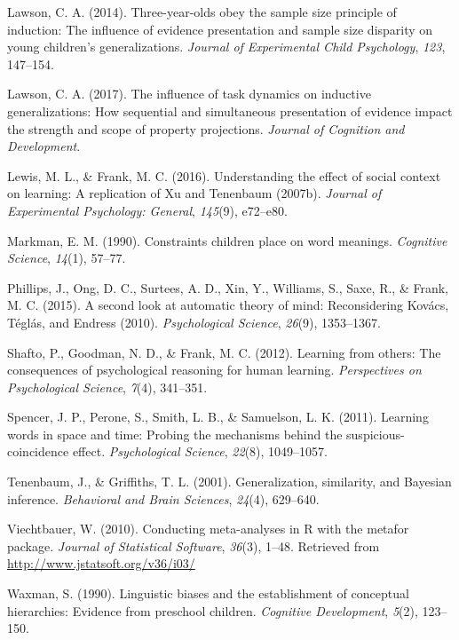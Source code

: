 \documentclass[english,floatsintext,man]{apa6}
\theoremstyle{definition}
\theoremstyle{definition}
\theoremstyle{definition}
\theoremstyle{remark}
\begin{document}
\hypertarget{ref-lawson2014three}{}
Lawson, C. A. (2014). Three-year-olds obey the sample size principle of
induction: The influence of evidence presentation and sample size
disparity on young children's generalizations. \emph{Journal of
Experimental Child Psychology}, \emph{123}, 147--154.

\hypertarget{ref-lawson2017influence}{}
Lawson, C. A. (2017). The influence of task dynamics on inductive
generalizations: How sequential and simultaneous presentation of
evidence impact the strength and scope of property projections.
\emph{Journal of Cognition and Development}.

\hypertarget{ref-lewis2016understanding}{}
Lewis, M. L., \& Frank, M. C. (2016). Understanding the effect of social
context on learning: A replication of Xu and Tenenbaum (2007b).
\emph{Journal of Experimental Psychology: General}, \emph{145}(9),
e72--e80.

\hypertarget{ref-markman1990constraints}{}
Markman, E. M. (1990). Constraints children place on word meanings.
\emph{Cognitive Science}, \emph{14}(1), 57--77.

\hypertarget{ref-phillips2015second}{}
Phillips, J., Ong, D. C., Surtees, A. D., Xin, Y., Williams, S., Saxe,
R., \& Frank, M. C. (2015). A second look at automatic theory of mind:
Reconsidering Kovács, Téglás, and Endress (2010). \emph{Psychological
Science}, \emph{26}(9), 1353--1367.

\hypertarget{ref-shafto2012}{}
Shafto, P., Goodman, N. D., \& Frank, M. C. (2012). Learning from
others: The consequences of psychological reasoning for human learning.
\emph{Perspectives on Psychological Science}, \emph{7}(4), 341--351.

\hypertarget{ref-spencer2011learning}{}
Spencer, J. P., Perone, S., Smith, L. B., \& Samuelson, L. K. (2011).
Learning words in space and time: Probing the mechanisms behind the
suspicious-coincidence effect. \emph{Psychological Science},
\emph{22}(8), 1049--1057.

\hypertarget{ref-tenenbaum2001}{}
Tenenbaum, J., \& Griffiths, T. L. (2001). Generalization, similarity,
and Bayesian inference. \emph{Behavioral and Brain Sciences},
\emph{24}(4), 629--640.

\hypertarget{ref-R-metafor}{}
Viechtbauer, W. (2010). Conducting meta-analyses in R with the metafor
package. \emph{Journal of Statistical Software}, \emph{36}(3), 1--48.
Retrieved from \url{http://www.jstatsoft.org/v36/i03/}

\hypertarget{ref-waxman1990}{}
Waxman, S. (1990). Linguistic biases and the establishment of conceptual
hierarchies: Evidence from preschool children. \emph{Cognitive
Development}, \emph{5}(2), 123--150.
\end{document}
